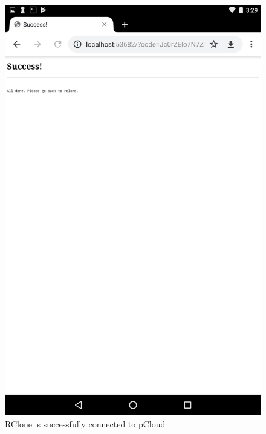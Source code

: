 \begin{figure}[htb]
  \centering
  \includegraphics[scale=0.2]{images/pcloud3.png}
  \caption{RClone is successfully connected to pCloud}
  \label{fig:pcloud3}
\end{figure}
